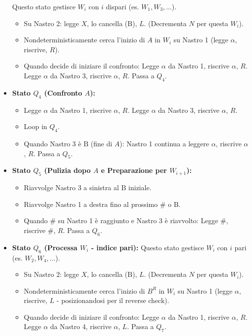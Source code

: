 \documentclass[a4paper, 11pt]{book} %
\theoremstyle{definition}
\newcommand{\B}{\text{B}} %
\begin{document}
\begin{itemize}
        Questo stato gestisce $W_i$ con $i$ dispari (es. $W_1, W_3, \dots$).
        \begin{itemize}
            \item Su Nastro 2: legge $X$, lo cancella ($\B$), $L$. (Decrementa $N$ per questa $W_i$).
            \item Nondeterministicamente cerca l'inizio di $A$ in $W_i$ su Nastro 1 (legge $\alpha$, riscrive, $R$).
            \item Quando decide di iniziare il confronto: Legge $\alpha$ da Nastro 1, riscrive $\alpha$, $R$. Legge $\alpha$ da Nastro 3, riscrive $\alpha$, $R$. Passa a $Q_4$.
        \end{itemize}
    \item \textbf{Stato $Q_4$ (Confronto $A$):}
        \begin{itemize}
            \item Legge $\alpha$ da Nastro 1, riscrive $\alpha$, $R$. Legge $\alpha$ da Nastro 3, riscrive $\alpha$, $R$.
            \item Loop in $Q_4$.
            \item Quando Nastro 3 è $\B$ (fine di $A$): Nastro 1 continua a leggere $\alpha$, riscrive $\alpha$, $R$. Passa a $Q_5$.
        \end{itemize}
    \item \textbf{Stato $Q_5$ (Pulizia dopo $A$ e Preparazione per $W_{i+1}$):}
        \begin{itemize}
            \item Riavvolge Nastro 3 a sinistra al $\B$ iniziale.
            \item Riavvolge Nastro 1 a destra fino al prossimo $\#$ o $\B$.
            \item Quando $\#$ su Nastro 1 è raggiunto e Nastro 3 è riavvolto: Legge $\#$, riscrive $\#$, $R$. Passa a $Q_6$.
        \end{itemize}
    \item \textbf{Stato $Q_6$ (Processa $W_i$ - indice pari):}
        Questo stato gestisce $W_i$ con $i$ pari (es. $W_2, W_4, \dots$).
        \begin{itemize}
            \item Su Nastro 2: legge $X$, lo cancella ($\B$), $L$. (Decrementa $N$ per questa $W_i$).
            \item Nondeterministicamente cerca l'inizio di $B^R$ in $W_i$ su Nastro 1 (legge $\alpha$, riscrive, $L$ - posizionandosi per il reverse check).
            \item Quando decide di iniziare il confronto: Legge $\alpha$ da Nastro 1, riscrive $\alpha$, $R$. Legge $\alpha$ da Nastro 4, riscrive $\alpha$, $L$. Passa a $Q_7$.

\end{itemize}
\end{itemize}
\end{document}
